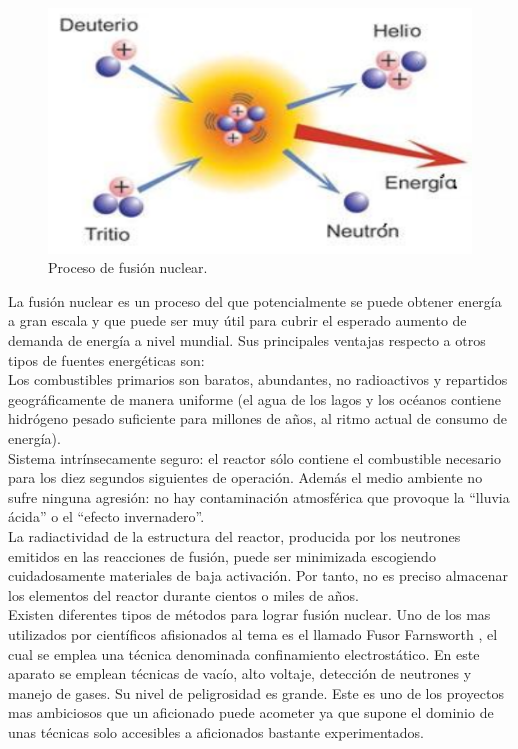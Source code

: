\begin{figure}[H]
\centering
\includegraphics[width=12cm]{capitulo3/figs/fusi.png}
\caption{ Proceso de fusión nuclear.}
\end{figure}

La fusión nuclear es un proceso del que potencialmente se puede obtener energía a gran escala y que puede ser muy útil para cubrir el esperado aumento de demanda de energía a nivel mundial. Sus principales ventajas respecto a otros tipos de fuentes energéticas son:\\

Los combustibles primarios son baratos, abundantes, no radioactivos y repartidos geográficamente de manera uniforme (el agua de los lagos y los océanos contiene hidrógeno pesado suficiente para millones de años, al ritmo actual de consumo de energía).\\

Sistema intrínsecamente seguro: el reactor sólo contiene el combustible necesario para los diez segundos siguientes de operación. Además el medio ambiente no sufre ninguna agresión: no hay contaminación atmosférica que provoque la “lluvia ácida” o el “efecto invernadero”.\\

La radiactividad de la estructura del reactor, producida por los neutrones emitidos en las reacciones de fusión, puede ser minimizada escogiendo cuidadosamente materiales de baja activación. Por tanto, no es preciso almacenar los elementos del reactor durante cientos o miles de años. \cite{fusion} \\

Existen diferentes tipos de métodos para lograr fusión nuclear. Uno de los mas utilizados por científicos afisionados al tema es el llamado Fusor Farnsworth \cite{fusor}, el cual se emplea una técnica denominada confinamiento electrostático. En este aparato se emplean técnicas de vacío, alto voltaje, detección de neutrones y manejo de gases. Su nivel de peligrosidad es grande. Este es uno de los proyectos mas ambiciosos que un aficionado puede acometer ya que supone el dominio de unas técnicas solo accesibles a aficionados bastante experimentados.


